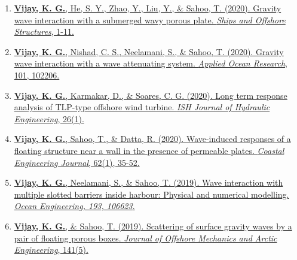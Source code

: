 \begin{enumerate}[label=\protect\circled{\arabic*}]
\item \href{https://doi.org/10.1080/17445302.2020.1789034}{%
\textbf{Vijay, K. G.}, He, S. Y., Zhao, Y., Liu, Y., \& Sahoo, T. (2020). Gravity wave interaction with a submerged wavy porous plate. \textit{Ships and Offshore Structures}, 1-11.}

\item \href{https://doi.org/10.1016/j.apor.2020.102206}{%
\textbf{Vijay, K. G.}, Nishad, C. S., Neelamani, S., \& Sahoo, T. (2020). Gravity wave interaction with a wave attenuating system. \textit{Applied Ocean Research}, 101, 102206.}

\item \href{https://doi.org/10.1080/09715010.2018.1437790}{%
\textbf{Vijay, K. G.}, Karmakar, D., \& Soares, C. G. (2020). Long term response analysis of TLP-type offshore wind turbine. \textit{ISH Journal of Hydraulic Engineering}, 26(1).}

\item \href{https://doi.org/10.1080/21664250.2019.1691339}{%
\textbf{Vijay, K. G.}, Sahoo, T., \& Datta, R. (2020). Wave-induced responses of a floating structure near a wall in the presence of permeable plates. \textit{Coastal Engineering Journal}, 62(1), 35-52.}

\item \href{https://doi.org/10.1016/j.oceaneng.2019.106623}{%
\textbf{Vijay, K. G.}, Neelamani, S., \& Sahoo, T. (2019). Wave interaction with multiple slotted barriers inside harbour: Physical and numerical modelling. \textit{Ocean Engineering, 193, 106623}.}

\item \href{https://doi.org/10.1115/1.4043415}{
\textbf{Vijay, K. G.}, \& Sahoo, T. (2019). Scattering of surface gravity waves by a pair of floating porous boxes. \textit{Journal of Offshore Mechanics and Arctic Engineering}, 141(5).}
\end{enumerate}

